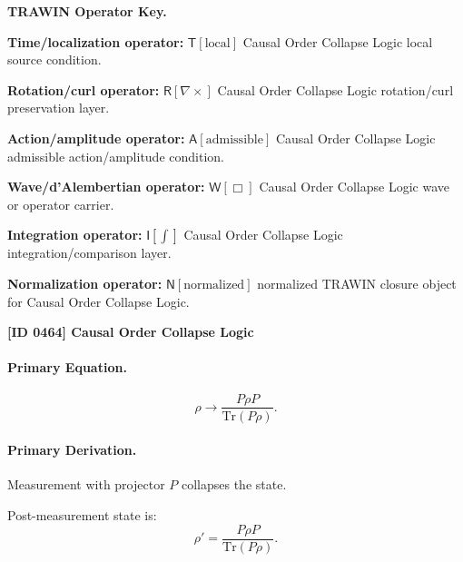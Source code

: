 \par\vspace{0.45\baselineskip}
\noindent\begin{minipage}[t]{\linewidth}
\begingroup
\small
\raggedright
\textbf{TRAWIN Operator Key.}\par
\noindent\textbf{Time/localization operator:} $\mathsf{T}\!\left[\mathrm{local}\right]$ Causal Order Collapse Logic local source condition.\par
\noindent\textbf{Rotation/curl operator:} $\mathsf{R}\!\left[\nabla\times\right]$ Causal Order Collapse Logic rotation/curl preservation layer.\par
\noindent\textbf{Action/amplitude operator:} $\mathsf{A}\!\left[\mathrm{admissible}\right]$ Causal Order Collapse Logic admissible action/amplitude condition.\par
\noindent\textbf{Wave/d'Alembertian operator:} $\mathsf{W}\!\left[\Box\right]$ Causal Order Collapse Logic wave or operator carrier.\par
\noindent\textbf{Integration operator:} $\mathsf{I}\!\left[\int\right]$ Causal Order Collapse Logic integration/comparison layer.\par
\noindent\textbf{Normalization operator:} $\mathsf{N}\!\left[\mathrm{normalized}\right]$ normalized TRAWIN closure object for Causal Order Collapse Logic.\par
\endgroup
\end{minipage}

\clearpage
\noindent\textbf{[ID 0464] Causal Order Collapse Logic}\par
\vspace{0.35em}
\paragraph{Primary Equation.}
\begin{equation}
\rho \rightarrow \frac{P \rho P}{\mathrm{Tr}(P\rho)}.
\end{equation}

\paragraph{Primary Derivation.}
Measurement with projector $P$ collapses the state.

Post-measurement state is:
\begin{equation}
\rho' = \frac{P \rho P}{\mathrm{Tr}(P\rho)}.
\end{equation}

